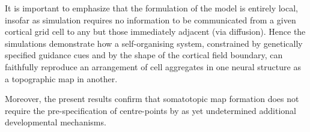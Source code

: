 \documentclass[9pt,twocolumn,twoside,lineno]{pnas-new}
\begin{document}
It is important to emphasize that the formulation of the model is entirely local, insofar as simulation requires no information to be communicated from a given cortical grid cell to any but those immediately adjacent (via diffusion). Hence the simulations demonstrate how a self-organising system, constrained by genetically specified guidance cues and by the shape of the cortical field boundary, can faithfully reproduce an arrangement of cell aggregates in one neural structure as a topographic map in another.

Moreover, the present results confirm that somatotopic map formation does not require the pre-specification of centre-points by as yet undetermined additional developmental mechanisms.


\showacknow{} %


\end{document}
